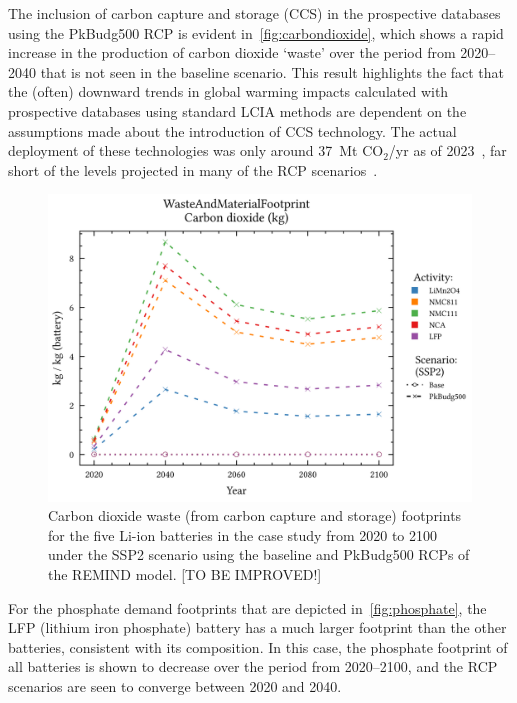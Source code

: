 The inclusion of carbon capture and storage (CCS) in the prospective databases using the PkBudg500 RCP is evident in~\autoref{fig:carbondioxide}, which shows a rapid increase in the production of carbon dioxide `waste' over the period from 2020--2040 that is not seen in the baseline scenario. This result highlights the fact that the (often) downward trends in global warming impacts calculated with prospective databases using standard LCIA methods are dependent on the assumptions made about the introduction of CCS technology. The actual deployment of these technologies was only around 37~Mt CO$_2$/yr as of 2023~\citep{dziejarski2023ccs}, far short of the levels projected in many of the RCP scenarios~\citep{sacchi2023premisedocs}.


\begin{figure}[H]
    \centering
    \includegraphics[width=0.7\linewidth]{figures/carbondioxide.png}
    \caption{Carbon dioxide waste (from carbon capture and storage) footprints for the five Li-ion batteries in the case study from 2020 to 2100 under the SSP2 scenario using the baseline and PkBudg500 RCPs of the REMIND model. [TO BE IMPROVED!]}\label{fig:carbondioxide}
\end{figure}

For the phosphate demand footprints that are depicted in~\autoref{fig:phosphate}, the LFP (lithium iron phosphate) battery has a much larger footprint than the other batteries, consistent with its composition. In this case, the phosphate footprint of all batteries is shown to decrease over the period from 2020--2100, and the RCP scenarios are seen to converge between 2020 and 2040.

